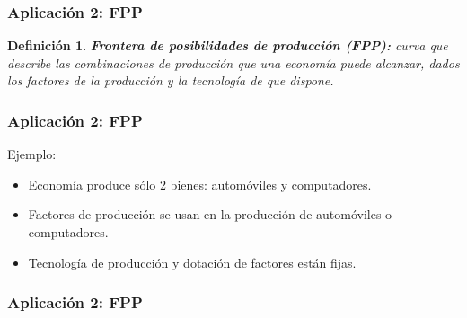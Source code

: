 \documentclass[dvipsnames,table]{beamer}
\newtheorem{mydef}{Definición}
\begin{document}
		\begin{frame}
			\frametitle{Aplicación 2: FPP}
			\begin{mydef}
				\textbf{Frontera de posibilidades de producción (FPP):} curva que describe las combinaciones de producción que una economía puede alcanzar, dados los factores de la producción y la tecnología de que dispone.
			\end{mydef}
		\end{frame}		

		\begin{frame}
			\frametitle{Aplicación 2: FPP}
			Ejemplo:
			\begin{itemize}
				\item Economía produce sólo 2 bienes: automóviles y computadores.
				\item Factores de producción se usan en la producción de automóviles o computadores.
				\item Tecnología de producción y dotación de factores están fijas.
			\end{itemize}
		\end{frame}	

		\begin{frame}
			\frametitle{Aplicación 2: FPP}
			\begin{table}[htbp!]
				\centering
			\end{table}
		\end{frame}	
\end{document}
